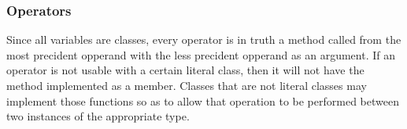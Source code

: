 \subsubsection{Operators}
Since all variables are classes, every operator is in truth a method called from the most precident opperand with the less precident opperand as an argument. If an operator is not usable with a certain literal class, then it will not have the method implemented as a member. Classes that are not literal classes may implement those functions so as to allow that operation to be performed between two instances of the appropriate type.
